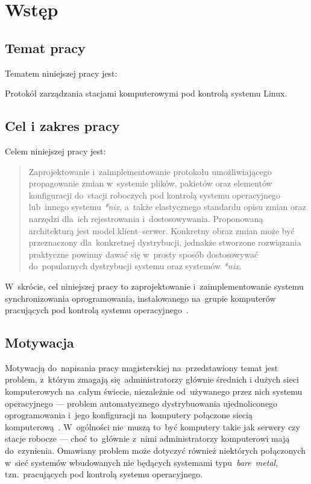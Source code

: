 \documentclass[praca_magisterska]{subfiles}
\begin{document}
\chapter{Wstęp}
\label{chapter:intro}

\section{Temat pracy}

\noindent Tematem niniejszej pracy jest:
\begin{displayquote}
Protokół zarządzania stacjami komputerowymi pod kontrolą systemu Linux.
\end{displayquote}

\section{Cel i zakres pracy}

\noindent Celem niniejszej pracy jest:
\blockcquote{formularz-zgloszenia-pracy}{Zaprojektowanie i~zaimplementowanie protokołu umożliwiającego propagowanie zmian w~systemie plików, pakietów oraz elementów konfiguracji do~stacji roboczych pod kontrolą systemu operacyjnego  lub~innego systemu \emph{*nix}, a~także elastycznego standardu opisu zmian oraz narzędzi dla~ich rejestrowania i~dostosowywania. Proponowaną architekturą jest model klient--serwer. Konkretny obraz zmian może być przeznaczony dla~konkretnej dystrybucji, jednakże stworzone rozwiązania praktyczne powinny dawać się w~prosty sposób dostosowywać do~popularnych dystrybucji systemu  oraz systemów \emph{*nix}.}
W~skrócie, cel niniejszej pracy to zaprojektowanie i~zaimplementowanie systemu synchronizowania oprogramowania, instalowanego na~grupie komputerów pracujących pod kontrolą systemu operacyjnego~.

\section{Motywacja}

Motywacją do~napisania pracy magisterskiej na~przedstawiony temat jest problem, z~którym zmagają się~administratorzy głównie średnich i dużych sieci komputerowych na~całym świecie, niezależnie od~używanego przez nich systemu operacyjnego --- problem automatycznego dystrybuowania ujednoliconego oprogramowania i~jego konfiguracji na~komputery połączone siecią komputerową~\cite{so-problem-intro}. W~ogólności nie~muszą to~być komputery takie jak serwery czy stacje robocze --- choć to~głównie z~nimi administratorzy komputerowi mają do~czynienia. Omawiany problem może dotyczyć również niektórych połączonych w~sieć systemów wbudowanych nie będących systemami typu~\mbox{\emph{bare~metal}}, tzn.~pracujących pod kontrolą systemu operacyjnego.
\end{document}

